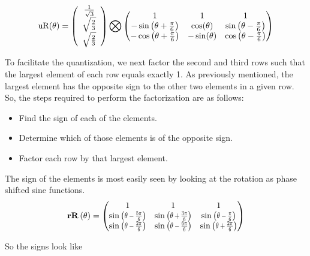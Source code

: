 \begin{equation}
\text{uR}(\theta) =
\left(
\begin{array}{c}
 \frac{1}{\sqrt{3}} \\
 \sqrt{\frac{2}{3}}  \\
 \sqrt{\frac{2}{3}} \\
\end{array}
\right) \bigotimes
\begin{pmatrix}
 1 & 1 & 1 \\
 -\sin \left(\theta +\frac{\pi}{6}\right) &  \cos (\theta ) &  \sin \left(\theta -\frac{\pi}{6}\right) \\
 -\cos \left(\theta +\frac{\pi}{6}\right) & - \sin (\theta ) & \cos \left(\theta -\frac{\pi}{6}\right) \\
\end{pmatrix}
\end{equation}

To facilitate the quantization, we next factor the second and third rows such that the largest element of each row equals exactly 1. As previously mentioned, the largest element has the opposite sign to the other two elements in a given row. So, the steps required to perform the factorization are as follows:

\begin{itemize}
\item{Find the sign of each of the elements.}
\item{Determine which of those elements is of the opposite sign.}
\item{Factor each row by that largest element.}
\end{itemize}

The sign of the elements is most easily seen by looking at the rotation as phase shifted sine functions.
\begin{equation}
\rR[\theta]=
\begin{pmatrix}
 1 & 1 & 1 \\
 \sine{\theta -\frac{5 \pi }{6}}  & \sine{\theta +\frac{3 \pi }{6}}  & \sine{\theta -\Pii{6}}  \\
 \sine{\theta -\frac{2 \pi }{6}}  & \sine{\theta -\frac{6 \pi }{6}}  & \sine{\theta +\frac{2 \pi }{6}}  \\
\end{pmatrix}
\end{equation}

So the signs look like

